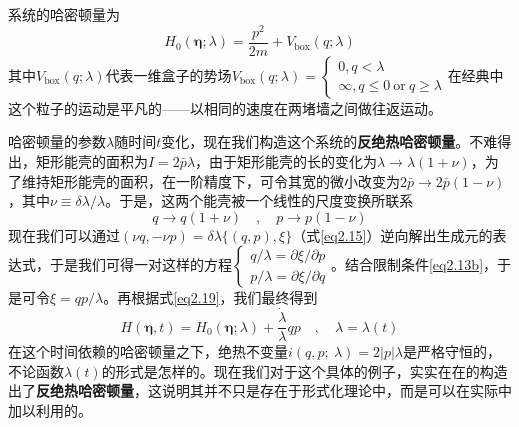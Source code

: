 系统的哈密顿量为
\begin{equation}
     H_{0}(\bm{\eta} ; \lambda)=\frac{p^{2}}{2 m}+V_{\mathrm{box}}(q ; \lambda)
        \label{eq2.18}
\end{equation}
其中$V_{\mathrm{box}}(q ; \lambda)$代表一维盒子的势场$V_{\mathrm{box}}(q ; \lambda) = \left\{\begin{array}{l} 0 , q<\lambda\\ \infty , q \leq 0\ \text{or}\ q \geq \lambda \end{array}\right.$在经典中这个粒子的运动是平凡的——以相同的速度在两堵墙之间做往返运动。
    
哈密顿量的参数$\lambda$随时间$t$变化，现在我们构造这个系统的\textbf{反绝热哈密顿量}。不难得出，矩形能壳的面积为$I=2 \bar{p} \lambda$，由于矩形能壳的长的变化为$\lambda \to \lambda(1+\nu)$，为了维持矩形能壳的面积，在一阶精度下，可令其宽的微小改变为$2 \bar{p} \to 2 \bar{p} (1-\nu)$，其中$\nu \equiv \delta \lambda / \lambda$。于是，这两个能壳被一个线性的尺度变换所联系
\begin{equation}
    q \rightarrow q(1+\nu) \quad, \quad p \rightarrow p(1-\nu)
    \label{eq2.19}
\end{equation}
现在我们可以通过$(\nu q, -\nu p)  = \delta \lambda \{ (q, p), \xi \}$（式\eqref{eq2.15}）逆向解出生成元的表达式，于是我们可得一对这样的方程$\left\{ \begin{array}{l} q / \lambda=\partial \xi / \partial p \\ p / \lambda=\partial \xi / \partial q \end{array}\right.$。结合限制条件\eqref{eq2.13b}，于是可令$\xi = q p / \lambda$。再根据式\eqref{eq2.19}，我们最终得到
\begin{equation}
    H(\bm{\eta}, t)=H_{0}(\bm{\eta} ; \lambda)+\frac{\dot{\lambda}}{\lambda} q p \quad, \quad \lambda=\lambda(t)
    \label{eq2.20}
\end{equation}
在这个时间依赖的哈密顿量之下，绝热不变量$i(q, p;\ \lambda)=2 |p| \lambda$是严格守恒的，不论函数$\lambda(t)$的形式是怎样的。现在我们对于这个具体的例子，实实在在的构造出了\textbf{反绝热哈密顿量}，这说明其并不只是存在于形式化理论中，而是可以在实际中加以利用的。

